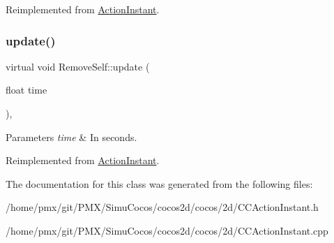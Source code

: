Reimplemented from \hyperlink{classActionInstant_a59875bf08cd1f58c0c8c6693ac540ade}{Action\+Instant}.

\mbox{\label{classRemoveSelf_ae77d0c282e5eba09f092ebec570fbc71}} 
\subsubsection{\texorpdfstring{update()}{update()}\hspace{0.1cm}{\footnotesize\ttfamily [2/2]}}
{\footnotesize\ttfamily virtual void Remove\+Self\+::update (\begin{DoxyParamCaption}\item[{float}]{time }\end{DoxyParamCaption})\hspace{0.3cm}{\ttfamily [override]}, {\ttfamily [virtual]}}


\begin{DoxyParams}{Parameters}
{\em time} & In seconds. \\
\hline
\end{DoxyParams}


Reimplemented from \hyperlink{classActionInstant_a59875bf08cd1f58c0c8c6693ac540ade}{Action\+Instant}.



The documentation for this class was generated from the following files\+:\begin{DoxyCompactItemize}
\item 
/home/pmx/git/\+P\+M\+X/\+Simu\+Cocos/cocos2d/cocos/2d/C\+C\+Action\+Instant.\+h\item 
/home/pmx/git/\+P\+M\+X/\+Simu\+Cocos/cocos2d/cocos/2d/C\+C\+Action\+Instant.\+cpp\end{DoxyCompactItemize}
